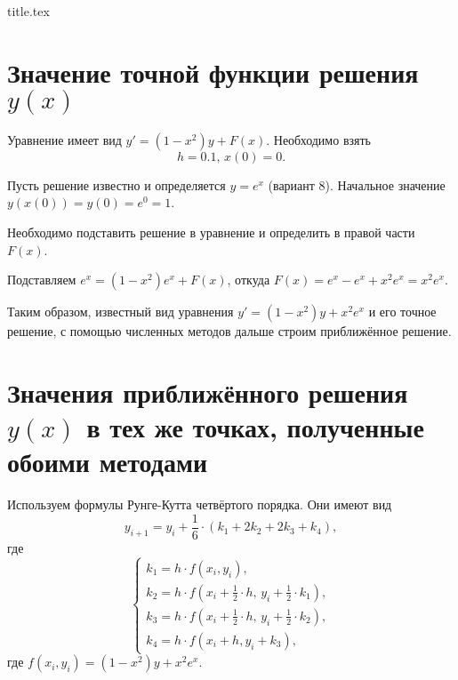 




{title.tex}

\clearpage


\pagestyle{empty}
\thispagestyle{empty}
\tableofcontents

\clearpage
{}
\pagestyle{fancy}
\setcounter{page}{2}

\clearpage

\chapter{Значение точной функции решения $y \left( x \right) $}

Уравнение имеет вид $y' = \left( 1 - x^2 \right) y + F \left( x \right) $.
Необходимо взять
$$h = 0.1, \,
  x \left( 0 \right) = 0.$$

Пусть решение известно и определяется $y = e^x$ (вариант 8).
Начальное значение $y \left( x \left( 0 \right) \right) = y \left( 0 \right) = e^0 = 1$.

Необходимо подставить решение в уравнение и определить в правой части $F \left( x \right) $.

Подставляем $e^x = \left( 1 - x^2 \right) e^x + F \left( x \right) $,
откуда $F \left( x \right) = e^x - e^x + x^2 e^x = x^2 e^x$.

Таким образом,
известный вид уравнения $y' = \left( 1 - x^2 \right) y + x^2 e^x$ и его точное решение,
с помощью численных методов дальше строим приближённое решение.

\chapter{Значения приближённого решения $y \left( x \right) $ в тех же точках,
        полученные обоими методами}

Используем формулы Рунге-Кутта четвёртого порядка.
Они имеют вид
$$y_{i + 1} =
  y_i + \frac{1}{6} \cdot \left( k_1 + 2k_2 + 2k_3 + k_4 \right),$$
где
$$ \begin{cases}
    k_1 = h \cdot f \left( x_i, y_i \right), \\
    k_2 = h \cdot f \left( x_i + \frac{1}{2} \cdot h, \, y_i + \frac{1}{2} \cdot k_1 \right), \\
    k_3 = h \cdot f \left( x_i + \frac{1}{2} \cdot h, \, y_i + \frac{1}{2} \cdot k_2 \right), \\
    k_4 = h \cdot f \left( x_i + h, y_i + k_3 \right),
  \end{cases}$$
где $f \left( x_i, y_i \right) = \left( 1 - x^2 \right) y + x^2 e^x$.

